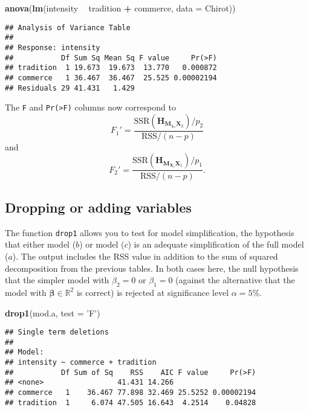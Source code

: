 \documentclass[]{book}
\newenvironment{Shaded}{\begin{snugshade}}{\end{snugshade}}
\newcommand{\DataTypeTok}[1]{\textcolor[rgb]{0.13,0.29,0.53}{#1}}
\newcommand{\KeywordTok}[1]{\textcolor[rgb]{0.13,0.29,0.53}{\textbf{#1}}}
\newcommand{\NormalTok}[1]{#1}
\newcommand{\OperatorTok}[1]{\textcolor[rgb]{0.81,0.36,0.00}{\textbf{#1}}}
\newcommand{\StringTok}[1]{\textcolor[rgb]{0.31,0.60,0.02}{#1}}
\theoremstyle{definition}
\theoremstyle{definition}
\theoremstyle{definition}
\theoremstyle{remark}
\begin{document}
\begin{Shaded}
\begin{Highlighting}[]
\KeywordTok{anova}\NormalTok{(}\KeywordTok{lm}\NormalTok{(intensity }\OperatorTok{~}\StringTok{ }\NormalTok{tradition }\OperatorTok{+}\StringTok{ }\NormalTok{commerce, }\DataTypeTok{data =}\NormalTok{ Chirot))}
\end{Highlighting}
\end{Shaded}

\begin{verbatim}
## Analysis of Variance Table
## 
## Response: intensity
##           Df Sum Sq Mean Sq F value     Pr(>F)
## tradition  1 19.673  19.673  13.770   0.000872
## commerce   1 36.467  36.467  25.525 0.00002194
## Residuals 29 41.431   1.429
\end{verbatim}

The \texttt{F} and \texttt{Pr(\textgreater{}F)} columns now correspond to
\[F_1' = \frac{\mathrm{SSR}(\mathbf{H}_{\mathbf{M}_{\mathbf{1}_n}\mathbf{X}_2})/p_2}{\mathrm{RSS}/(n-p)}\]
and
\[F_2' = \frac{\mathrm{SSR}(\mathbf{H}_{\mathbf{M}_{\mathbf{X}_c}\mathbf{X}_1})/p_1}{\mathrm{RSS}/(n-p)}.\]

\hypertarget{dropping-or-adding-variables}{%
\subsection{Dropping or adding variables}\label{dropping-or-adding-variables}}

The function \texttt{drop1} allows you to test for model simplification, the hypothesis that either model (\(b\)) or model (\(c\)) is an adequate simplification of the full model (\(a\)). The output includes the RSS value in addition to the sum of squared decomposition from the previous tables. In both cases here, the null hypothesis that the simpler model with \(\beta_2=0\) or \(\beta_1=0\) (against the alternative that the model with \(\boldsymbol{\beta} \in \mathbb{R}^2\) is correct) is rejected at significance level \(\alpha = 5\%\).

\begin{Shaded}
\begin{Highlighting}[]
\KeywordTok{drop1}\NormalTok{(mod.a, }\DataTypeTok{test =} \StringTok{'F'}\NormalTok{)}
\end{Highlighting}
\end{Shaded}

\begin{verbatim}
## Single term deletions
## 
## Model:
## intensity ~ commerce + tradition
##           Df Sum of Sq    RSS    AIC F value     Pr(>F)
## <none>                 41.431 14.266                   
## commerce   1    36.467 77.898 32.469 25.5252 0.00002194
## tradition  1     6.074 47.505 16.643  4.2514    0.04828
\end{verbatim}
\end{document}
